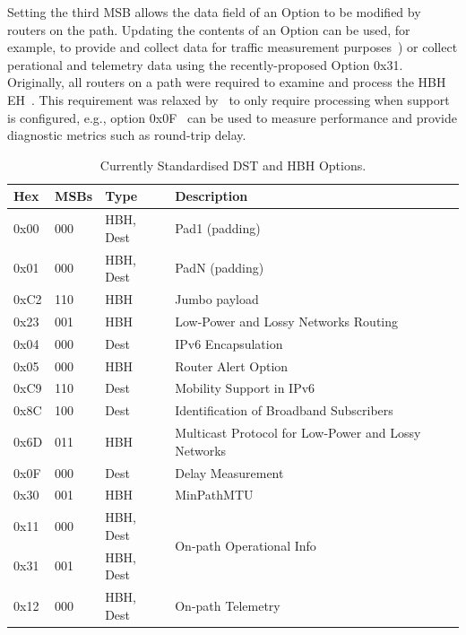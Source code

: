 \documentclass[conference]{IEEEtran}
\begin{document}
Setting the third MSB allows the data field of an Option to be modified by
routers on the path. Updating the contents of an Option can be used, for
example, to provide and collect data for traffic measurement
purposes~\cite{rfc9268}\cite{rfc9343}) or collect perational and telemetry
data using the recently-proposed Option 0x31.  Originally, all routers on a
path were required to examine and process the HBH EH~\cite{rfc2460}. This
requirement was relaxed by~\cite{RFC8200} to only require processing when
support is configured, e.g., option 0x0F~\cite{rfc8250} can be used to measure
performance and provide diagnostic metrics such as round-trip delay. 


\begin{table}[b]
\center
\caption{Currently Standardised DST and HBH Options.}
\begin{tabular}{p{}|p{}|l|p{}}
Hex  & MSBs & Type      & Description                                              \\
\hline
\hline
0x00 & 000  & HBH, Dest & Pad1 (padding)                                           \\
0x01 & 000  & HBH, Dest & PadN (padding)                                           \\
0xC2 & 110  & HBH       & Jumbo payload                                  \\
0x23 & 001  & HBH       & Low-Power and Lossy Networks Routing                     \\
0x04 & 000  & Dest      & IPv6 Encapsulation                 \\
0x05 & 000  & HBH       & Router Alert Option         \\
0xC9 & 110  & Dest      & Mobility Support in IPv6                                 \\
0x8C & 100  & Dest      & Identification of Broadband Subscribers\\
0x6D & 011  & HBH       & Multicast Protocol for Low-Power and  Lossy Networks     \\
0x0F & 000  & Dest      & Delay Measurement                                        \\
0x30 & 001  & HBH       & MinPathMTU                                     \\
0x11 & 000  & HBH, Dest & \multirow{2}{*}{On-path Operational Info}                \\
0x31 & 001  & HBH, Dest &                                                          \\
0x12 & 000  & HBH, Dest & On-path Telemetry                                       
\end{tabular}
  \label{tbl:options}
\end{table}
\end{document}
